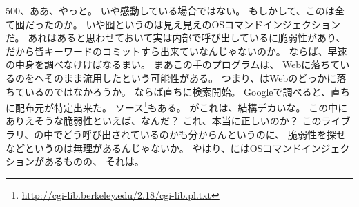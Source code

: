 500、ああ、やっと。
いや感動している場合ではない。
もしかして、このは全て囮だったのか。
いや囮というのは見え見えのOSコマンドインジェクションだ。
あれはあると思わせておいて実は内部で呼び出しているに脆弱性があり、
だから皆キーワードのコミットすら出来ていなんじゃないのか。
ならば、早速の中身を調べなけけばなるまい。
まあこの手のプログラムは、
Webに落ちているのをへそのまま流用したという可能性がある。
つまり、はWebのどっかに落ちているのではなかろうか。
ならば直ちに検索開始。
Googleで調べると、直ちに配布元が特定出来た。
ソース\footnote{\url{http://cgi-lib.berkeley.edu/2.18/cgi-lib.pl.txt}}もある。
がこれは、結構デカいな。
この中にありえそうな脆弱性といえば、なんだ？
これ、本当に正しいのか？
このライブラリ、の中でどう呼び出されているのかも分からんというのに、
脆弱性を探せなどというのは無理があるんじゃないか。
やはり、にはOSコマンドインジェクションがあるものの、
それは。





